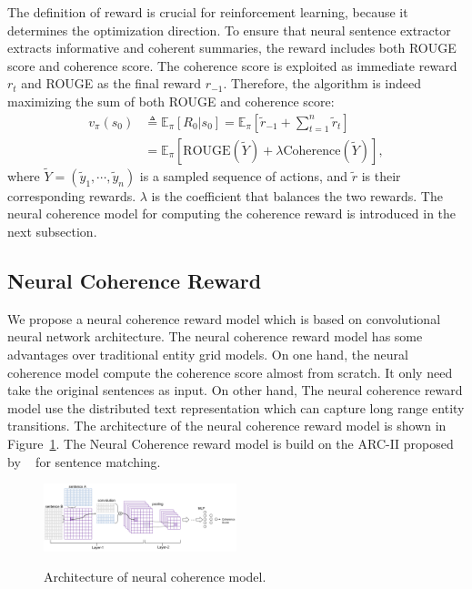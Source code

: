 \documentclass[letterpaper]{article} %
\begin{document}
	The definition of reward is crucial for reinforcement learning, because it determines the optimization direction. To ensure that neural sentence extractor extracts informative and coherent summaries, the reward includes both ROUGE score and coherence score. The coherence score is exploited as immediate reward $r_t$ and ROUGE as the final reward $r_{-1}$. Therefore, the algorithm is indeed maximizing the sum of both ROUGE and coherence score:
	\begin{align}
	v_{\pi}(s_0) &\triangleq \mathbb{E}_{\pi}[R_0 |s_0] = \mathbb{E}_{\pi} [ \tilde{r}_{-1} + \sum_{t=1}^{n} \tilde{r}_t ] \\
	&= \mathbb{E}_{\pi} [ \text{ROUGE}(\tilde{Y}) + \lambda \text{Coherence}(\tilde{Y}) ] , \label{eq:reward_sum}
	\end{align}
	where $\tilde{Y} = (\tilde{y}_1, \cdots, \tilde{y}_n)$ is a sampled sequence of actions, and $\tilde{r}$ is their corresponding rewards. $\lambda$ is the coefficient that balances the two rewards. The neural coherence model for computing the coherence reward is introduced in the next subsection.
	
	
	\subsection{Neural Coherence Reward}
	We propose a neural coherence reward model which is based on convolutional neural network architecture.  The neural coherence reward model has some advantages over traditional entity grid models. On one hand, the neural coherence model compute the coherence score almost from scratch. It only need take the original sentences as input. On other hand,  The neural coherence reward model use the distributed text representation which can capture long range entity transitions. The architecture of the neural coherence reward model is shown in Figure~\ref{coherence}. The Neural Coherence reward model is build on the ARC-II proposed by ~\cite{NIPS2014_hu} for sentence matching.
	
	\begin{figure}
		\includegraphics[width=0.5\textwidth]{./images/coherence.png}
		\label{coherence}
		\caption{Architecture of neural coherence model.}
	\end{figure}
	
\end{document}
